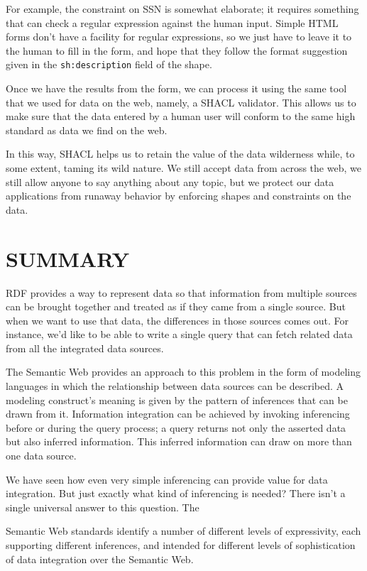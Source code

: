 For example, the constraint on SSN is somewhat elaborate; it requires
something that can check a regular expression against the human
input.  Simple HTML forms don't have a facility for regular
expressions, so we just have to leave it to the human to fill in the
form, and hope that they follow the format suggestion given in the
\texttt{sh:description} field of the shape.

Once we have the results from the form, we can process it using the
same tool that we used for data on the web, namely, a SHACL
validator. This allows us to make sure that the data entered by a
human user will conform to the same high standard as data we find on
the web.

In this way, SHACL helps us to retain the value of the data wilderness
while, to some extent, taming its wild nature.  We still accept data
from across the web, we still allow anyone to say anything about any
topic, but we protect our data applications from runaway behavior by
enforcing shapes and constraints on the data.


\section{SUMMARY}

RDF provides a way to represent data so that information from multiple
sources can be brought together and treated as if they came from a
single source. But when we want to use that data, the differences in
those sources comes out. For instance, we'd like to be able to write a
single query that can fetch related data from all the integrated data
sources.

The Semantic Web provides an approach to this problem in the form of
modeling languages in which the relationship between data sources can be
described. A modeling construct's meaning is given by the pattern of
inferences that can be drawn from it. Information integration can be
achieved by invoking inferencing before or during the query process; a
query returns not only the asserted data but also inferred information.
This inferred information can draw on more than one data source.

We have seen how even very simple inferencing can provide value for data
integration. But just exactly what kind of inferencing is needed? There
isn't a single universal answer to this question. The

Semantic Web standards identify a number of different levels of
expressivity, each supporting different inferences, and intended for
different levels of sophistication of data integration over the Semantic
Web.

